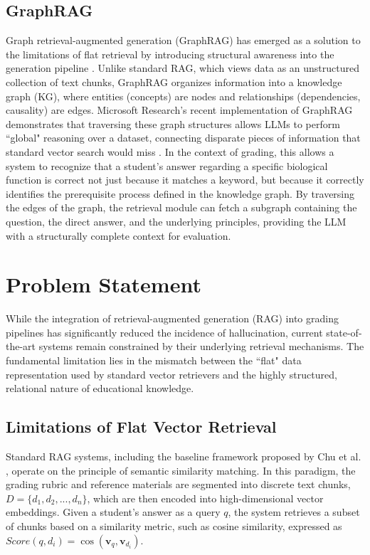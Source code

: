 \documentclass{edm_article}
\begin{document}
\subsection{GraphRAG}
Graph retrieval-augmented generation (GraphRAG) has emerged as a solution to the limitations of flat retrieval by introducing structural awareness into the generation pipeline \cite{han2024retrieval}. Unlike standard RAG, which views data as an unstructured collection of text chunks, GraphRAG organizes information into a knowledge graph (KG), where entities (concepts) are nodes and relationships (dependencies, causality) are edges. Microsoft Research's recent implementation of GraphRAG demonstrates that traversing these graph structures allows LLMs to perform ``global" reasoning over a dataset, connecting disparate pieces of information that standard vector search would miss \cite{edge2024from}. In the context of grading, this allows a system to recognize that a student's answer regarding a specific biological function is correct not just because it matches a keyword, but because it correctly identifies the prerequisite process defined in the knowledge graph. By traversing the edges of the graph, the retrieval module can fetch a subgraph containing the question, the direct answer, and the underlying principles, providing the LLM with a structurally complete context for evaluation.



\section{Problem Statement}

While the integration of retrieval-augmented generation (RAG) into grading pipelines has significantly reduced the incidence of hallucination, current state-of-the-art systems remain constrained by their underlying retrieval mechanisms. The fundamental limitation lies in the mismatch between the ``flat" data representation used by standard vector retrievers and the highly structured, relational nature of educational knowledge.

\subsection{Limitations of Flat Vector Retrieval}
Standard RAG systems, including the baseline framework proposed by Chu et al. \cite{chu2025enhancing}, operate on the principle of semantic similarity matching. In this paradigm, the grading rubric and reference materials are segmented into discrete text chunks, $D = \{d_1, d_2, ..., d_n\}$, which are then encoded into high-dimensional vector embeddings. Given a student's answer as a query $q$, the system retrieves a subset of chunks based on a similarity metric, such as cosine similarity, expressed as $Score(q, d_i) = \cos(\mathbf{v}_q, \mathbf{v}_{d_i})$.
\end{document}
